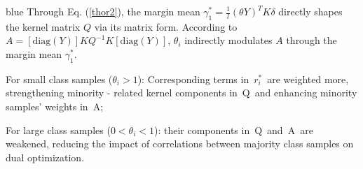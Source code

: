 \documentclass[a4paper]{cas-sc}
\begin{document}
\begin{color}{blue}
Through Eq. (\ref{thor2}), the margin mean \(\gamma_1^* = \frac{1}{l} (\theta Y)^T K \delta\) directly shapes the kernel matrix \(Q\) via its matrix form. According to $A = [\text{diag}(Y)]KQ^{-1}K[\text{diag}(Y)]$, \(\theta_i\) indirectly modulates \(A\) through the margin mean \(\gamma_1^*\).

For small class samples (\(\theta_i > 1\)): Corresponding terms in \(r_i^*\) are weighted more, strengthening minority - related kernel components in Q and enhancing minority samples’ weights in A;

For large class samples (\(0 < \theta_i < 1\)): their components in Q and A are weakened, reducing the impact of correlations between majority class samples on dual optimization.

\end{color}





\end{document}
